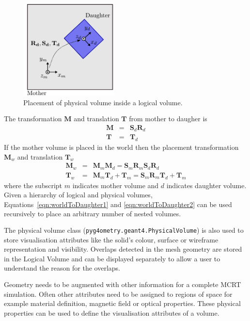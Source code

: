 \documentclass[final,5p,times,twocolumn]{elsarticle}
\newcommand{\pyinline}[1]{\lstinline[postbreak={}]{#1}}
\begin{document}
\begin{figure}[htb!]
\begin{center}
\includegraphics[width=5cm]{./diagrams/lvToPv.pdf}
\caption{Placement of physical volume inside a logical volume.}
\label{fig:lvToPv}
\end{center}
\end{figure} 

The transformation  $\mathbf{M}$  and translation $\mathbf{T}$ from mother to daugher is 
\begin{eqnarray}
\mathbf{M} 	& = &  \mathbf{S}_d  \mathbf{R}_d \\
\mathbf{T} 	& = &  \mathbf{T}_d
\end{eqnarray}
%
If the mother volume is placed in the world then the placement transformation $\mathbf{M}_w$ and translation $\mathbf{T}_w$ 
\begin{eqnarray}
\mathbf{M}_w	  	& = & \mathbf{M}_m \mathbf{M}_d  = \mathbf{S}_m \mathbf{R}_m  \mathbf{S}_d \mathbf{R}_d				\label{eqn:worldToDaughter1}\\
\mathbf{T}	_w 		& = & \mathbf{M}_m \mathbf{T}_d + \mathbf{T}_m= \mathbf{S}_m \mathbf{R}_m \mathbf{T}_d + \mathbf{T}_m  \label{eqn:worldToDaughter2}
\end{eqnarray}
where the subscript $m$ indicates mother volume and $d$ indicates daughter volume. Given a hierarchy of logical and physical volumes, 
Equations~\ref{eqn:worldToDaughter1} and \ref{eqn:worldToDaughter2} can be used recursively to place an arbitrary number of nested volumes.

The physical volume class (\pyinline{pyg4ometry.geant4.PhysicalVolume}) is also used to store visualisation attributes like the solid's 
colour, surface or wireframe representation and visibility. Overlaps detected in the mesh geometry are
stored in the Logical Volume and can be  displayed separately to allow a user to understand the reason for 
the overlaps.   

Geometry needs to be augmented with other information for a complete MCRT simulation. Often other attributes need to be 
assigned to regions of space for example material definition, magnetic field or optical properties. These physical properties 
can be used to define the visualisation attributes of a volume. 
\end{document}

